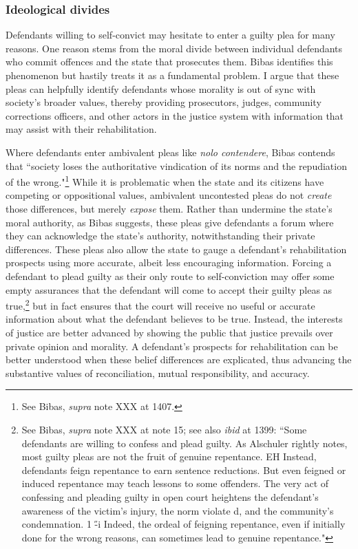 \subsubsection{Ideological divides}

Defendants willing to self-convict may hesitate to enter a guilty plea for many reasons. One reason stems from the moral divide between individual defendants who commit offences and the state that prosecutes them. Bibas identifies this phenomenon but hastily treats it as a fundamental problem. I argue that these pleas can helpfully identify defendants whose morality is out of sync with society's broader values, thereby providing prosecutors, judges, community corrections officers, and other actors in the justice system with information that may assist with their rehabilitation.

Where defendants enter ambivalent pleas like \textit{nolo contendere}, Bibas contends that ``society loses the authoritative vindication of its norms and the repudiation of the wrong."\footnote{See Bibas, \textit{supra} note XXX at 1407.} While it is problematic when the state and its citizens have competing or oppositional values, ambivalent uncontested pleas do not \textit{create} those differences, but merely \textit{expose} them. Rather than undermine the state's moral authority, as Bibas suggests, these pleas give defendants a forum where they can acknowledge the state's authority, notwithstanding their private differences. These pleas also allow the state to gauge a defendant's rehabilitation prospects using more accurate, albeit less encouraging information. Forcing a defendant to plead guilty as their only route to self-conviction may offer some empty assurances that the defendant will come to accept their guilty pleas as true,\footnote{See Bibas, \textit{supra} note XXX at note 15; see also \textit{ibid} at 1399: ``Some defendants are willing to confess and plead guilty. As Alschuler rightly notes, most guilty pleas are not the fruit of genuine repentance. EH Instead, defendants feign repentance to earn sentence reductions. But even feigned or induced repentance may teach lessons to some offenders. The very act of confessing and pleading guilty in open court heightens the defendant's awareness of the victim's injury, the norm violate d, and the community's condemnation. 1 \H-i Indeed, the ordeal of feigning repentance, even if initially done for the wrong reasons, can sometimes lead to genuine repentance."} but in fact ensures that the court will receive no useful or accurate information about what the defendant believes to be true. Instead, the interests of justice are better advanced by showing the public that justice prevails over private opinion and morality. A defendant's prospects for rehabilitation can be better understood when these belief differences are explicated, thus advancing the substantive values of reconciliation, mutual responsibility, and accuracy.

